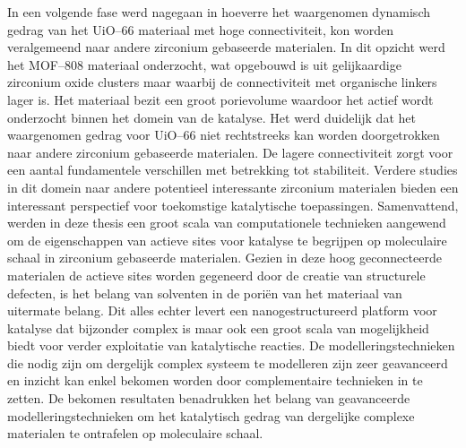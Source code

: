 In een volgende fase werd nagegaan in hoeverre het waargenomen dynamisch gedrag van het UiO--66 materiaal met hoge connectiviteit, kon worden veralgemeend naar andere zirconium gebaseerde materialen. In dit opzicht werd het MOF--808 materiaal onderzocht, wat opgebouwd is uit gelijkaardige zirconium oxide clusters maar waarbij de connectiviteit met organische linkers lager is. Het materiaal bezit een groot porievolume waardoor het actief wordt onderzocht binnen het domein van de katalyse. Het werd duidelijk dat het waargenomen gedrag voor UiO--66 niet rechtstreeks kan worden doorgetrokken naar andere zirconium gebaseerde materialen. De lagere connectiviteit zorgt voor een aantal fundamentele verschillen met betrekking tot stabiliteit. Verdere studies in dit domein naar andere potentieel interessante zirconium materialen bieden een interessant perspectief voor toekomstige katalytische toepassingen. 
\npar
Samenvattend, werden in deze thesis een groot scala van computationele technieken aangewend om de eigenschappen van actieve sites voor katalyse te begrijpen op moleculaire schaal in zirconium gebaseerde materialen. Gezien in deze hoog geconnecteerde materialen de actieve sites worden gegeneerd door de creatie van structurele defecten, is het belang van solventen in de poriën van het materiaal van uitermate belang. Dit alles echter levert een nanogestructureerd platform voor katalyse dat bijzonder complex is maar ook een groot scala van mogelijkheid biedt voor verder exploitatie van katalytische reacties. De modelleringstechnieken die nodig zijn om dergelijk complex systeem te modelleren zijn zeer geavanceerd en inzicht kan enkel bekomen worden door complementaire technieken in te zetten. De bekomen resultaten benadrukken het belang van geavanceerde modelleringstechnieken om het katalytisch gedrag van dergelijke complexe materialen te ontrafelen op moleculaire schaal. 




